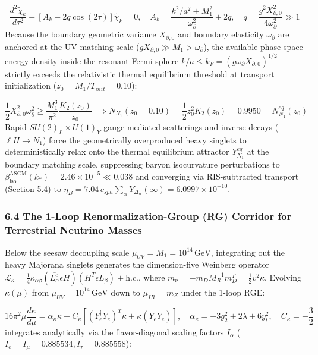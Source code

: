 \documentclass[aps,prd,onecolumn,superscriptaddress,nofootinbib,longbibliography,10pt]{revtex4-2}
\begin{document}
{{\[\frac{d^2\tilde{\chi}_k}{d\tau^2} + [A_k - 2q \cos(2\tau)]\tilde{\chi}_k = 0, \quad A_k = \frac{k^2/a^2 + M_1^2}{\omega_\partial^2} + 2q, \quad q = \frac{g^2 X_{\partial,0}^2}{4\omega_\partial^2} \gg 1\]
Because the boundary geometric variance \(X_{\partial,0}\) and boundary elasticity \(\omega_\partial\) are anchored at the UV matching scale (\(g X_{\partial,0} \gg M_1 > \omega_\partial\)), the available phase-space energy density inside the resonant Fermi sphere \(k/a \le k_F = (g\omega_\partial X_{\partial,0})^{1/2}\) strictly exceeds the relativistic thermal equilibrium threshold at transport initialization (\(z_0 = M_1 / T_{init} = 0.10\)):


\[\frac{1}{2}X_{\partial,0}^2 \omega_\partial^2 \ge \frac{M_1^3}{\pi^2} \frac{K_2(z_0)}{z_0} \implies N_{N_1}(z_0 = 0.10) = \frac{1}{2}z_0^2 K_2(z_0) = 0.9950 = N_{N_1}^{eq}(z_0)\]
Rapid \(SU(2)_L \times U(1)_Y\) gauge-mediated scatterings and inverse decays (\(\bar{\ell}\bar{H} \to N_1\)) force the geometrically overproduced heavy singlets to deterministically relax onto the thermal equilibrium attractor \(Y_{N_1}^{eq}\) at the boundary matching scale, suppressing baryon isocurvature perturbations to \(\beta_{\mathrm{iso}}^{\mathrm{ASCM}}(k_*) = 2.46 \times 10^{-5} \ll 0.038\) and converging via RIS-subtracted transport (Section 5.4) to \(\eta_B = 7.04\,c_{sph} \sum_\alpha Y_{\Delta_\alpha}(\infty) = 6.0997 \times 10^{-10}\).




\subsubsection*{6.4 The 1-Loop Renormalization-Group (RG) Corridor for Terrestrial Neutrino Masses}

Below the seesaw decoupling scale \(\mu_{UV} = M_1 = 10^{14}\,\mathrm{GeV}\), integrating out the heavy Majorana singlets generates the dimension-five Weinberg operator \(\mathcal{L}_\kappa = \frac{1}{4}\kappa_{\alpha\beta}(\overline{L_\alpha^c} \epsilon H)(H^T \epsilon L_\beta) + \mathrm{h.c.}\), where \(m_\nu = -m_D M_R^{-1} m_D^T = \frac{1}{2}v^2\kappa\). Evolving \(\kappa(\mu)\) from \(\mu_{UV} = 10^{14}\,\mathrm{GeV}\) down to \(\mu_{IR} = m_Z\) under the 1-loop RGE:


\[16\pi^2 \mu \frac{d\kappa}{d\mu} = \alpha_\kappa \kappa + C_\kappa \left[ (Y_e^\dagger Y_e)^T \kappa + \kappa (Y_e^\dagger Y_e) \right], \quad \alpha_\kappa = -3g_2^2 + 2\lambda + 6y_t^2, \quad C_\kappa = -\frac{3}{2}\]
integrates analytically via the flavor-diagonal scaling factors \(I_\alpha\) (\(I_e = I_\mu = 0.885534, I_\tau = 0.885558\)):


}}
\end{document}
